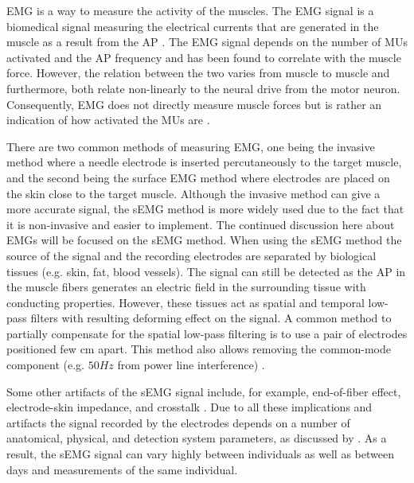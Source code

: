 \documentclass[../main.tex]{subfiles}
\begin{document}
\Ac{EMG} is a way to measure the activity of the muscles.
The \ac{EMG} signal is a biomedical signal measuring the electrical currents that are generated in the muscle as a result from the \ac{AP} \cite{Raez2006}.
The \ac{EMG} signal depends on the number of \acp{MU} activated and the \ac{AP} frequency and has been found to correlate with the muscle force.
However, the relation between the two varies from muscle to muscle and furthermore, both relate non-linearly to the neural drive from the motor neuron.
Consequently, \ac{EMG} does not directly measure muscle forces but is rather an indication of how activated the \acp{MU} are \cite{Enoka2016, Farina2016}.

There are two common methods of measuring \ac{EMG}, one being the invasive method where a needle electrode is inserted percutaneously to the target muscle, and the second being the surface \ac{EMG} method where electrodes are placed on the skin close to the target muscle. 
Although the invasive method can give a more accurate signal, the \ac{sEMG} method is more widely used due to the fact that it is non-invasive and easier to implement. 
The continued discussion here about \ac{EMG}s will be focused on the \ac{sEMG} method.
When using the \ac{sEMG} method the source of the signal and the recording electrodes are separated by biological tissues (e.g. skin, fat, blood vessels).
The signal can still be detected as the \ac{AP} in the muscle fibers generates an electric field in the surrounding tissue with conducting properties.
However, these tissues act as spatial and temporal low-pass filters with resulting deforming effect on the signal.
A common method to partially compensate for the spatial low-pass filtering is to use a pair of electrodes positioned few cm apart.
This method also allows removing the common-mode component (e.g. $50Hz$ from power line interference) \cite{Farina2016}.

Some other artifacts of the \ac{sEMG} signal include, for example, end-of-fiber effect, electrode-skin impedance, and crosstalk \cite{Farina2016}.
Due to all these implications and artifacts the signal recorded by the electrodes depends on a number of anatomical, physical, and detection system parameters, as discussed by \textcite[p. 41]{Farina2016}. 
As a result, the \ac{sEMG} signal can vary highly between individuals as well as between days and measurements of the same individual.
\end{document}
